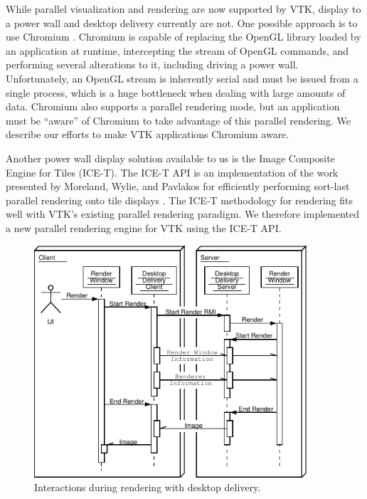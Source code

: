 \documentclass{acmsiggraph}
\begin{document}
  While parallel visualization and rendering are now supported by VTK,
  display to a power wall and desktop delivery currently are not.  One
  possible approach is to use Chromium \cite{Humphreys02}.  Chromium is
  capable of replacing the OpenGL library loaded by an application at
  runtime, intercepting the stream of OpenGL commands, and performing
  several alterations to it, including driving a power wall.
  Unfortunately, an OpenGL stream is inherently serial and must be issued
  from a single process, which is a huge bottleneck when dealing with large
  amounts of data.  Chromium also supports a parallel rendering mode, but
  an application must be ``aware'' of Chromium to take advantage of this
  parallel rendering.  We describe our efforts to make VTK applications
  Chromium aware.

  Another power wall display solution available to us is the Image
  Composite Engine for Tiles (ICE-T).  The ICE-T API is an implementation
  of the work presented by Moreland, Wylie, and Pavlakos for efficiently
  performing sort-last parallel rendering onto tile displays
  \cite{Moreland01}.  The ICE-T methodology for rendering fits well with
  VTK's existing parallel rendering paradigm.  We therefore implemented a
  new parallel rendering engine for VTK using the ICE-T API.


  \begin{figure}[ht]
    \begin{center}
      \includegraphics[width=4in]{images/DesktopDeliveryInteraction}
      \caption{Interactions during rendering with desktop delivery.}
      \label{fig:desktop_delivery_interaction}
    \end{center}
  \end{figure}
\end{document}
